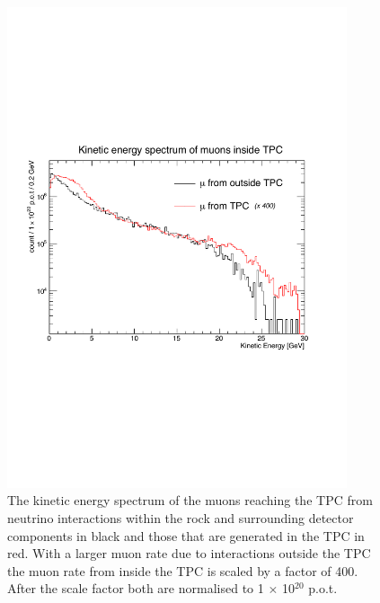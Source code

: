 \begin{figure}[htbp]
\begin{center}
  	\includegraphics[width=100mm]{Chapter4/figures/muonKinEnergy_tpcAndRock.pdf}
	\caption{The kinetic energy spectrum of the muons reaching the TPC from neutrino interactions within the rock and surrounding detector components in black and those that are generated in the TPC in red. With a larger muon rate due to interactions outside the TPC the muon rate from inside the TPC is scaled by a factor of 400. After the scale factor both are normalised to 1 $\times$ 10$^{20}$ p.o.t.}
	\label{fig:rockMuonEnergy}
\end{center}
\end{figure}

